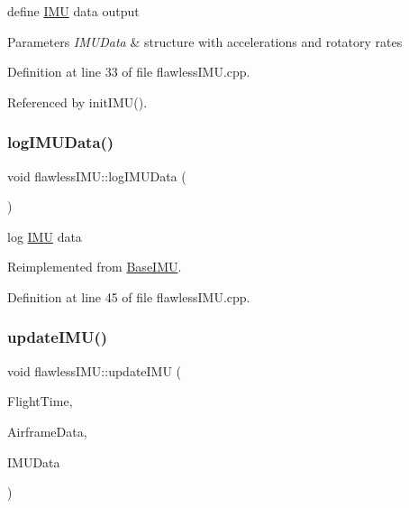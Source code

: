 define \hyperlink{class_i_m_u}{I\+MU} data output 


\begin{DoxyParams}{Parameters}
{\em I\+M\+U\+Data} & structure with accelerations and rotatory rates \\
\hline
\end{DoxyParams}


Definition at line 33 of file flawless\+I\+M\+U.\+cpp.



Referenced by init\+I\+M\+U().

\mbox{\label{classflawless_i_m_u_a31224296938675108b60a89948c459a8}} 
\subsubsection{\texorpdfstring{log\+I\+M\+U\+Data()}{logIMUData()}}
{\footnotesize\ttfamily void flawless\+I\+M\+U\+::log\+I\+M\+U\+Data (\begin{DoxyParamCaption}{ }\end{DoxyParamCaption})\hspace{0.3cm}{\ttfamily [virtual]}}



log \hyperlink{class_i_m_u}{I\+MU} data 



Reimplemented from \hyperlink{class_base_i_m_u_a8f323eb821f92300af5047ed9c66b116}{Base\+I\+MU}.



Definition at line 45 of file flawless\+I\+M\+U.\+cpp.

\mbox{\label{classflawless_i_m_u_a3d3bf018147ba61788fd3e842dded37e}} 
\subsubsection{\texorpdfstring{update\+I\+M\+U()}{updateIMU()}}
{\footnotesize\ttfamily void flawless\+I\+M\+U\+::update\+I\+MU (\begin{DoxyParamCaption}\item[{\hyperlink{group___tools_ga3f1431cb9f76da10f59246d1d743dc2c}{Float64}}]{Flight\+Time,  }\item[{Airframe\+Struct \&}]{Airframe\+Data,  }\item[{I\+M\+U\+Struct \&}]{I\+M\+U\+Data }\end{DoxyParamCaption})\hspace{0.3cm}{\ttfamily [virtual]}}



